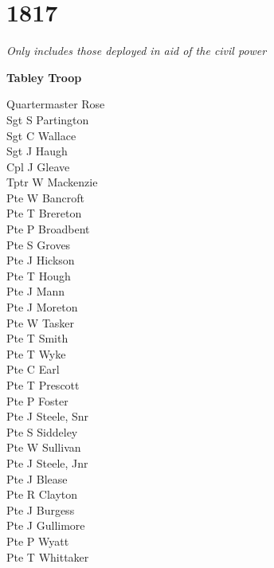 \chapter*{1817}

\vspace*{10mm}

\begin{center}
  \textit{Only includes those deployed in aid of the civil power}
\end{center}

\vspace*{10mm}

\begin{center}
  \Large
  \textbf{Tabley Troop}
\end{center}

\begin{multicols}{3}
  \noindent
  Quartermaster Rose \\
  Sgt S Partington \\
  Sgt C Wallace \\
  Sgt J Haugh \\
  Cpl J Gleave \\
  Tptr W Mackenzie \\
  Pte W Bancroft \\
  Pte T Brereton \\
  Pte P Broadbent \\
  Pte S Groves \\
  Pte J Hickson \\
  Pte T Hough \\
  Pte J Mann \\
  Pte J Moreton \\
  Pte W Tasker \\
  Pte T Smith \\
  Pte T Wyke \\
  Pte C Earl \\
  Pte T Prescott \\
  Pte P Foster \\
  Pte J Steele, Snr \\
  Pte S Siddeley \\
  Pte W Sullivan \\
  Pte J Steele, Jnr \\
  Pte J Blease \\
  Pte R Clayton \\
  Pte J Burgess \\
  Pte J Gullimore \\
  Pte P Wyatt \\
  Pte T Whittaker \\

\end{multicols}
